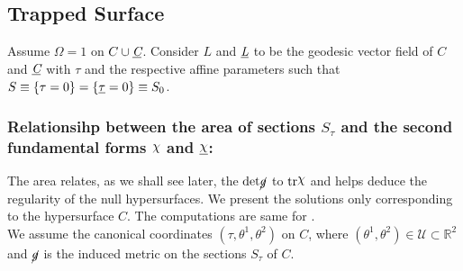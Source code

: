 \documentclass[12pt, a4paper]{report}
\theoremstyle{bfnote}
\newcommand{\underit}[1]{\textit{\underbar{#1}}}
\newcommand{\chits}{\raisebox{0.5ex}{$\chi$}} %
\begin{document}
\subsection{Trapped Surface}
Assume $\Omega = 1$ on $C \cup \textit{\underbar{C}}$. Consider $L$ and
$\underit{L}$ to be the geodesic vector field of $C$ and $\underit{C}$ with
$\tau$ and \underit{$\tau$} the respective affine parameters such that $S \equiv
\{\tau = 0\} = \{\underit{$\tau$} = 0\} \equiv S_0$.

\subsubsection*{Relationsihp between the area of sections $S_\tau$ and the second fundamental forms $\chits$
and $\underit{\chits}$:} 
The area relates, as we shall see later, the
$\mathrm{det}\cancel{g}$ to $\mathrm{tr}\chits$ and helps deduce the regularity of the
null hypersurfaces. We present the solutions only corresponding to the
hypersurface $C$. The computations are same for \underit{C}.\\
We assume the canonical coordinates $\left(\tau, \theta^1, \theta^2\right)$ on
$C$, where $\left(\theta^1, \theta^2\right) \in \mathcal{U} \subset \mathbb{R}^2$
and $\cancel{g}$ is the induced metric on the sections $S_\tau$ of $C$.
\end{document}
